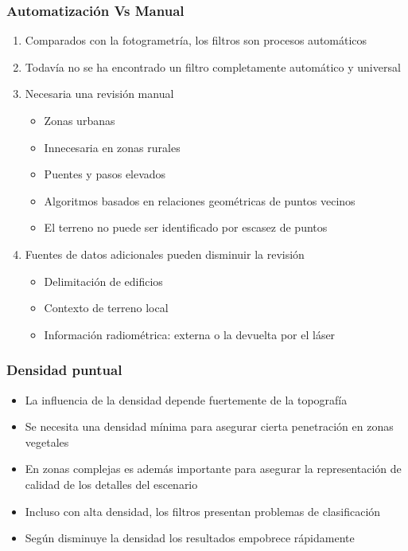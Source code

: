 \begin{frame}
  \frametitle{Automatización Vs Manual}
  \begin{enumerate}
    \item Comparados con la fotogrametría, los filtros son procesos \alert{automáticos}
    \item Todavía no se ha encontrado un filtro completamente automático y
      \alert{universal}
    \item \alert{Necesaria} una revisión manual
      \begin{itemize}
        \item Zonas urbanas 
        \item \alert{Innecesaria en zonas rurales}
        \item Puentes y pasos elevados
        \item Algoritmos basados en relaciones geométricas de puntos vecinos
        \item El terreno no puede ser identificado por escasez de puntos
      \end{itemize}
    \item Fuentes de datos adicionales pueden disminuir la revisión
      \begin{itemize}
        \item Delimitación de edificios
        \item Contexto de terreno local
        \item Información radiométrica: \alert{externa} o la \alert{devuelta por
          el láser}
      \end{itemize}
  \end{enumerate}
\end{frame}
\begin{frame}
  \frametitle{Densidad puntual}
  \begin{itemize}
    \item La influencia de la densidad depende fuertemente de la topografía
    \item Se necesita una densidad mínima para asegurar cierta penetración en
      zonas vegetales
    \item En zonas complejas es además importante para asegurar la
      representación de calidad de los detalles del escenario
    \item Incluso con alta densidad, los filtros presentan problemas de
      clasificación
    \item Según disminuye la densidad los resultados empobrece rápidamente
  \end{itemize}
\end{frame}
